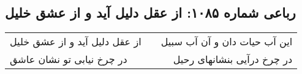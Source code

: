 \begin{center}
\section*{رباعی شماره ۱۰۸۵: از عقل دلیل آید و از عشق خلیل}
\label{sec:1085}
\begin{longtable}{l p{0.5cm} r}
از عقل دلیل آید و از عشق خلیل
&&
این آب حیات دان و آن آب سبیل
\\
در چرخ نیابی تو نشان عاشق
&&
در چرخ درآیی بنشانهای رحیل
\\
\end{longtable}
\end{center}
